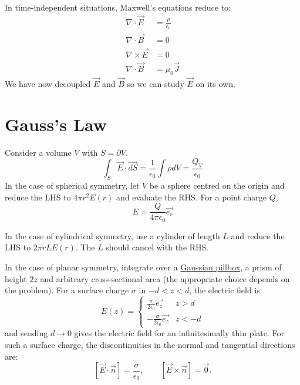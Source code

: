 \documentclass[../Main.tex]{subfiles}
\begin{document}
In time-independent situations, Maxwell's equations reduce to:
\begin{align}
    \nabla \cdot \vec{E} &= \frac{\rho}{\epsilon_0} \label{eqnMTED} \\
    \nabla \cdot \vec{B} &= 0 \label{eqnMTBD} \\
    \nabla \times \vec{E} &= 0 \label{eqnMTEC} \\
    \nabla \cdot \vec{B} &= \mu_0 \vec{J} \label{eqnMTBC}
\end{align}
We have now decoupled $\vec{E}$ and $\vec{B}$ so we can study $\vec{E}$ on its own.
\section{Gauss's Law}
Consider a volume $V$ with $S = \partial V$.
\begin{equation*}
    \int_S \vec{E} \cdot \vec{dS} = \frac{1}{\epsilon_0} \int\rho dV = \frac{Q_V}{\epsilon_0}
\end{equation*}
In the case of spherical symmetry, let $V$ be a sphere centred on the origin and reduce the LHS to $4\pi r^2 E(r)$ and evaluate the RHS. For a point charge $Q$,
\begin{equation*}
    E = \frac{Q}{4\pi \epsilon_0} \vec{e_r}
\end{equation*}

In the case of cylindrical symmetry, use a cylinder of length $L$ and reduce the LHS to $2\pi r LE(r)$. The $L$ should cancel with the RHS.

In the case of planar symmetry, integrate over a \underline{Gaussian pillbox}, a prism of height $2z$ and arbitrary cross-sectional area (the appropriate choice depends on the problem). For a surface charge $\sigma$ in $-d < z < d$, the electric field is:
\begin{equation*}
    E(z) = \begin{cases}
        \frac{\sigma}{2\epsilon_0}\vec{e_z} & z > d \\
        -\frac{\sigma}{2\epsilon_0}\vec{e_z} & z < -d
    \end{cases}
\end{equation*}
and sending $d \to 0$ gives the electric field for an infinitesimally thin plate. For such a surface charge, the discontinuities in the normal and tangential directions are:
\begin{equation*}
    \left[\vec{E} \cdot \vec{n}\right] = \frac{\sigma}{\epsilon_0},\qquad \left[\vec{E} \times \vec{n}\right] = \vec0.
\end{equation*}
\end{document}
